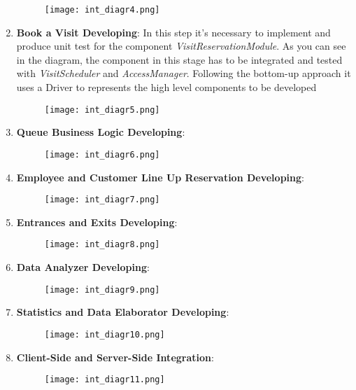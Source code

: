 \begin{enumerate}
\begin{figure}[H]
                \centering
                \texttt{[image: int\_diagr4.png]}
            \end{figure}
            \item \textbf{Book a Visit Developing}: In this step it's necessary to implement and produce unit test for the component \textit{VisitReservationModule}. As you can see in the diagram, the component in this stage has to be integrated and tested with \textit{VisitScheduler} and \textit{AccessManager}. Following the bottom-up approach it uses a Driver to represents the high level components to be developed \begin{figure}[H]
                \centering
                \texttt{[image: int\_diagr5.png]}
            \end{figure}
            \item \textbf{Queue Business Logic Developing}: \begin{figure}[H]
                \centering
                \texttt{[image: int\_diagr6.png]}
            \end{figure}
            \item \textbf{Employee and Customer Line Up Reservation Developing}: \begin{figure}[H]
                \centering
                \texttt{[image: int\_diagr7.png]}
            \end{figure}
            \item \textbf{Entrances and Exits Developing}: \begin{figure}[H]
                \centering
                \texttt{[image: int\_diagr8.png]}
            \end{figure}
            \item \textbf{Data Analyzer Developing}: \begin{figure}[H]
                \centering
                \texttt{[image: int\_diagr9.png]}
            \end{figure}
            \item \textbf{Statistics and Data Elaborator Developing}: \begin{figure}[H]
                \centering
                \texttt{[image: int\_diagr10.png]}
            \end{figure}
            \item \textbf{Client-Side and Server-Side Integration}: \begin{figure}[H]
                \centering
                \texttt{[image: int\_diagr11.png]}
            \end{figure}
        \end{enumerate}
